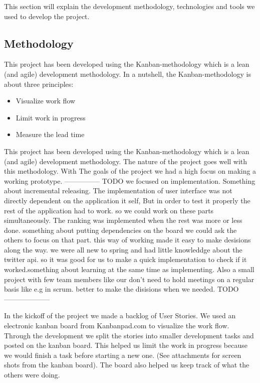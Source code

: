
This section will explain the development methodology, technologies and tools we used to develop the project. 

\subsection{Methodology}


This project has been developed using the Kanban-methodology which is a lean (and agile) development methodology. In a nutshell, the Kanban-methodology is about three principles: 
\begin{itemize}
\item Visualize work flow 
\item Limit work in progress 
\item Measure the lead time
\end{itemize}

This project has been developed using the Kanban-methodology which is a lean (and agile) development methodology. The nature of the project goes well with this methodology. With The goals of the project we had a high focus on making a working prototype. --------------- TODO we focused on implementation. Something about incremental releasing. The implementation of user interface was not directly dependent on the application it self,  But in order to test it properly the rest of the application had to work. so we could work on these parts simultaneously. The ranking was implemented when the rest was more or less done. something about putting dependencies on the board we could ask the others to focus on that part. 
this way of working made it easy to make desisions along the way. we were all new to spring and had little knowleddge about the twitter api. so it was good for us to make a quick implementation to check if it worked.something about learning at the same time as implementing. Also a small project with few team members like our don't need to hold meetings on a regular basis like e.g in scrum. better to make the disisions when we needed.  TODO --------------------


In the kickoff of the project we made a backlog of User Stories. We used an electronic kanban board from Kanbanpad.com \citep{TheHybridGroup2012} to visualize the work flow. Through the development we split the stories into smaller development tasks and posted on the kanban board. This helped us limit the work in progress because we would finish a task before starting a new one. (See attachments for screen shots from the kanban board). The board also helped us keep track of what the others were doing.

